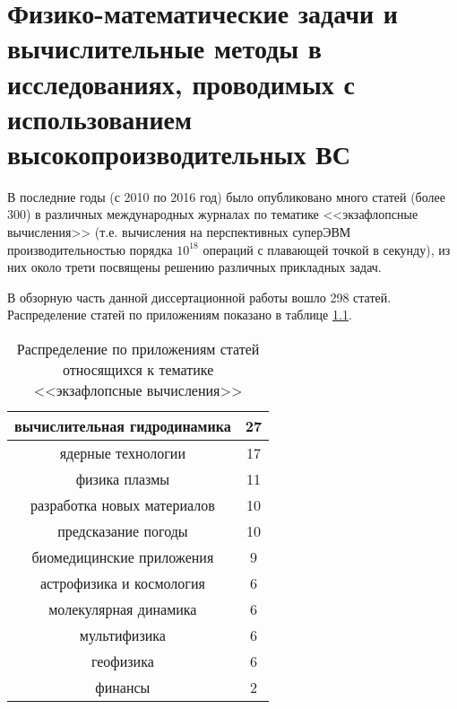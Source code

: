 \chapter{Физико-математические задачи и вычислительные методы в исследованиях, проводимых с использованием высокопроизводительных ВС} \label{chapt2}
В последние годы (с 2010 по 2016 год) было опубликовано много статей (более 300) в различных международных журналах по тематике <<экзафлопсные вычисления>> (т.е. вычисления на перспективных суперЭВМ производительностью порядка $10^{18}$ операций с плавающей точкой в секунду), из них около трети посвящены решению различных прикладных задач.

В обзорную часть данной диссертационной работы вошло 298 статей.  Распределение статей по приложениям показано в таблице \ref{tab_physics}.

\begin{table}[ht]
	\caption{Распределение по приложениям статей относящихся к тематике <<экзафлопсные вычисления>>}
	\begin{center}
		\begin{tabular}{|c|c|}
			\hline
			вычислительная гидродинамика & 27  \\ \hline 
			ядерные технологии & 17       \\ \hline  
			физика плазмы & 11  \\ \hline 
			разработка новых материалов & 10  \\ \hline 
			предсказание погоды & 10 \\ \hline 
			биомедицинские приложения & 9 \\ \hline 
			астрофизика и космология & 6  \\ \hline 
			молекулярная динамика   & 6   \\ \hline 
			мультифизика & 6              \\ \hline 
			геофизика & 6  \\ \hline 
			финансы & 2  \\ \hline 
		\end{tabular}
	\end{center}
	\label{tab_physics}
\end{table}

